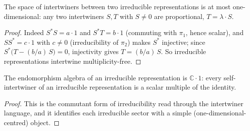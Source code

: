 \begin{lemma}
    \label{lmm:schur-multiplicity}
    \leanok
    The space of intertwiners between two irreducible representations is at most one-dimensional: any two intertwiners $S, T$ with $S \neq 0$ are proportional, $T = \lambda \cdot S$.
\end{lemma}
\begin{proof}
    \leanok
    Indeed $S^\ast S = a\cdot 1$ and $S^\ast T = b \cdot 1$ (commuting with $\pi_1$, hence scalar), and $S S^\ast = c \cdot 1$ with $c \neq 0$ (irreducibility of $\pi_2$) makes $S^\ast$ injective; since $S^\ast\big(T - (b/a)\,S\big) = 0$, injectivity gives $T = (b/a)\,S$. So irreducible representations intertwine multiplicity-free.
\end{proof}

\begin{lemma}
    \label{lmm:endomorphism-scalar}
    \leanok
    The endomorphism algebra of an irreducible representation is $\mathbb{C}\cdot 1$: every self-intertwiner of an irreducible representation is a scalar multiple of the identity.
\end{lemma}
\begin{proof}
    \leanok
    This is the commutant form of irreducibility read through the intertwiner language, and it identifies each irreducible sector with a simple (one-dimensional-centred) object.
\end{proof}

